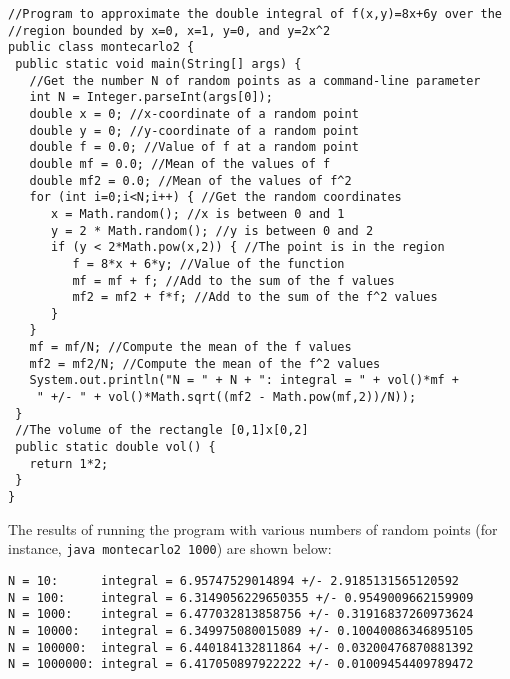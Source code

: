 \medskip
{}
\begin{lstlisting}
//Program to approximate the double integral of f(x,y)=8x+6y over the
//region bounded by x=0, x=1, y=0, and y=2x^2
public class montecarlo2 {
 public static void main(String[] args) {
   //Get the number N of random points as a command-line parameter
   int N = Integer.parseInt(args[0]);
   double x = 0; //x-coordinate of a random point
   double y = 0; //y-coordinate of a random point
   double f = 0.0; //Value of f at a random point
   double mf = 0.0; //Mean of the values of f
   double mf2 = 0.0; //Mean of the values of f^2
   for (int i=0;i<N;i++) { //Get the random coordinates
      x = Math.random(); //x is between 0 and 1
      y = 2 * Math.random(); //y is between 0 and 2
      if (y < 2*Math.pow(x,2)) { //The point is in the region
         f = 8*x + 6*y; //Value of the function
         mf = mf + f; //Add to the sum of the f values
         mf2 = mf2 + f*f; //Add to the sum of the f^2 values
      }
   }
   mf = mf/N; //Compute the mean of the f values
   mf2 = mf2/N; //Compute the mean of the f^2 values
   System.out.println("N = " + N + ": integral = " + vol()*mf +
    " +/- " + vol()*Math.sqrt((mf2 - Math.pow(mf,2))/N));
 }
 //The volume of the rectangle [0,1]x[0,2]
 public static double vol() {
   return 1*2;
 }
}
\end{lstlisting}

The results of running the program with various numbers of random points (for instance, \texttt{java montecarlo2 1000})
are shown below:

\begin{verbatim}
N = 10:      integral = 6.95747529014894 +/- 2.9185131565120592
N = 100:     integral = 6.3149056229650355 +/- 0.9549009662159909
N = 1000:    integral = 6.477032813858756 +/- 0.31916837260973624
N = 10000:   integral = 6.349975080015089 +/- 0.10040086346895105
N = 100000:  integral = 6.440184132811864 +/- 0.03200476870881392
N = 1000000: integral = 6.417050897922222 +/- 0.01009454409789472
\end{verbatim}

